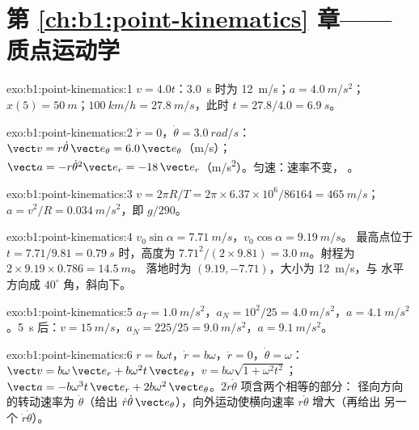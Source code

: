 \section*{第 \ref{ch:b1:point-kinematics} 章——质点运动学}

\begin{solution}{exo:b1:point-kinematics:1}
$v = 4.0t$：\qty{3.0}{s} 时为 \qty{12}{m/s}；$a = \qty{4.0}{m/s^2}$；
$x(5) = \qty{50}{m}$；$\qty{100}{km/h} = \qty{27.8}{m/s}$，此时 $t = 27.8/4.0
= \qty{6.9}{s}$。
\end{solution}

\begin{solution}{exo:b1:point-kinematics:2}
$\dot r = 0$，$\dot\theta = \qty{3.0}{rad/s}$：$\vect v = r\dot\theta\,\vect e_\theta
= 6.0\,\vect e_\theta$（\unit{m/s}）；$\vect a = -r\dot\theta^2\vect e_r =
-18\,\vect e_r$（\unit{m/s^2}）。匀速：速率不变，
。
\end{solution}

\begin{solution}{exo:b1:point-kinematics:3}
$v = 2\pi R/T = 2\pi \times 6.37\times10^6/86164 = \qty{465}{m/s}$；
$a = v^2/R = \qty{0.034}{m/s^2}$，即 $g/290$。
\end{solution}

\begin{solution}{exo:b1:point-kinematics:4}
$v_0\sin\alpha = \qty{7.71}{m/s}$，$v_0\cos\alpha = \qty{9.19}{m/s}$。
最高点位于 $t = 7.71/9.81 = \qty{0.79}{s}$ 时，高度为 $7.71^2/(2 \times 9.81) =
\qty{3.0}{m}$。射程为 $2 \times 9.19 \times 0.786 = \qty{14.5}{m}$。
落地时为 $(9.19, -7.71)$，大小为 \qty{12}{m/s}，与
水平方向成 $40^\circ$ 角，斜向下。
\end{solution}

\begin{solution}{exo:b1:point-kinematics:5}
$a_T = \qty{1.0}{m/s^2}$，$a_N = 10^2/25 = \qty{4.0}{m/s^2}$，$a =
\qty{4.1}{m/s^2}$。\qty{5}{s} 后：$v = \qty{15}{m/s}$，$a_N = 225/25 =
\qty{9.0}{m/s^2}$，$a = \qty{9.1}{m/s^2}$。
\end{solution}

\begin{solution}{exo:b1:point-kinematics:6}
$r = b\omega t$，$\dot r = b\omega$，$\ddot r = 0$，$\dot\theta = \omega$：
$\vect v = b\omega\,\vect e_r + b\omega^2 t\,\vect e_\theta$，$v = b\omega
\sqrt{1 + \omega^2t^2}$；$\vect a = -b\omega^3 t\,\vect e_r + 2b\omega^2\,
\vect e_\theta$。$2\dot r\dot\theta$ 项含两个相等的部分：
径向方向的转动速率为 $\dot\theta$（给出
$\dot r\dot\theta\,\vect e_\theta$），向外运动使横向速率 $r\dot\theta$ 增大（再给出
另一个 $\dot r\dot\theta$）。
\end{solution}


